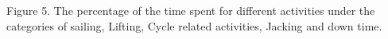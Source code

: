 Figure 5. The percentage of the time spent for different activities under the categories of sailing, Lifting, Cycle related activities, Jacking and down time.